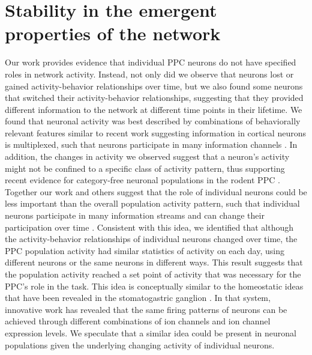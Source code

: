 \section{Stability in the emergent properties of the network} \label{discussion:emergent_prop}

Our work provides evidence that individual PPC neurons do not have specified roles in network activity. Instead, not only did we observe that neurons lost or gained activity-behavior relationships over time, but we also found some neurons that switched their activity-behavior relationships, suggesting that they provided different information to the network at different time points in their lifetime. We found that neuronal activity was best described by combinations of behaviorally relevant features similar to recent work suggesting information in cortical neurons is multiplexed, such that neurons participate in many information channels \citep{Cromer2010, Rigotti2013}. In addition, the changes in activity we observed suggest that a neuron's activity might not be confined to a specific class of activity pattern, thus supporting recent evidence for category-free neuronal populations in the rodent PPC \citep{Raposo2014}. Together our work and others suggest that the role of individual neurons could be less important than the overall population activity pattern, such that individual neurons participate in many information streams and can change their participation over time \citep{Yuste2015}. Consistent with this idea, we identified that although the activity-behavior relationships of individual neurons changed over time, the PPC population activity had similar statistics of activity on each day, using different neurons or the same neurons in different ways. This result suggests that the population activity reached a set point of activity that was necessary for the PPC's role in the task. This idea is conceptually similar to the homeostatic ideas that have been revealed in the stomatogastric ganglion \citep{Marder2011, OLeary2014, Prinz2004}. In that system, innovative work has revealed that the same firing patterns of neurons can be achieved through different combinations of ion channels and ion channel expression levels. We speculate that a similar idea could be present in neuronal populations given the underlying changing activity of individual neurons.